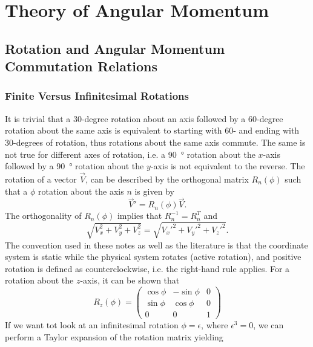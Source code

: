 \section{Theory of Angular Momentum}
\subsection{Rotation and Angular Momentum Commutation Relations}

\subsubsection{Finite Versus Infinitesimal Rotations}
It is trivial that a 30-degree rotation about an axis followed by a 60-degree rotation about the same axis is equivalent to starting with 60- and ending with 30-degrees of rotation, thus rotations about the same axis commute. The same is not true for different axes of rotation, i.e. a \qty{90}{\degree} rotation about the $x$-axis followed by a \qty{90}{\degree} rotation about the $y$-axis is not equivalent to the reverse. The rotation of a vector $\vec{V}$, can be described by the orthogonal matrix $R_n(\phi)$ such that a $\phi$ rotation about the axis $n$ is given by
\begin{equation}
    \vec{V}' = R_n(\phi) \vec{V}.
\end{equation}
The orthogonality of $R_n(\phi)$ implies that $R_n^{-1} = R_n^T$ and 
\begin{equation}
    \sqrt{V_x^2 + V_y^2 + V_z^2} = \sqrt{V_x'^2 + V_y'^2 + V_z'^2}.
\end{equation}
The convention used in these notes as well as the literature is that the coordinate system is static while the physical system rotates (active rotation), and positive rotation is defined as counterclockwise, i.e. the right-hand rule applies. For a rotation about the $z$-axis, it can be shown that
\begin{equation}
    R_z(\phi) = 
        \begin{pmatrix}
            \cos\phi & -\sin\phi & 0 \\
            \sin\phi & \cos\phi & 0 \\
            0 & 0 & 1
        \end{pmatrix}
\end{equation}
If we want tot look at an infinitesimal rotation $\phi = \epsilon$, where $\epsilon^3 = 0$, we can perform a Taylor expansion of the rotation matrix yielding
